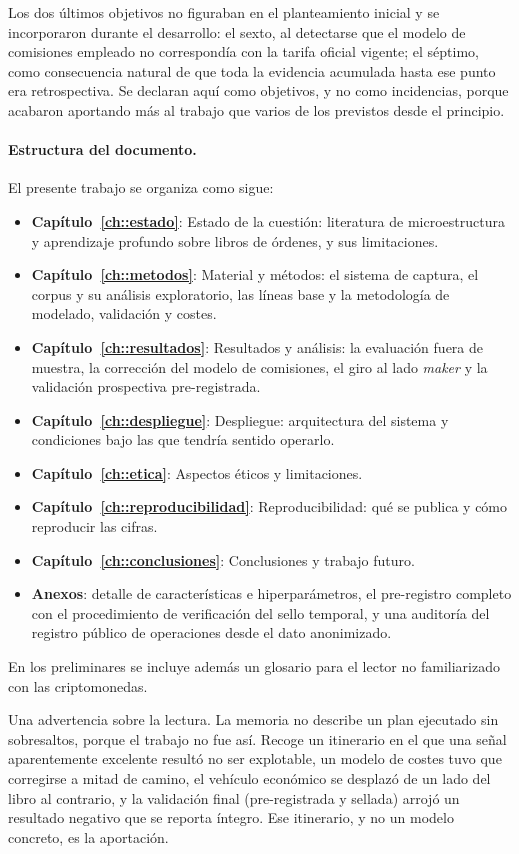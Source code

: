 Los dos últimos objetivos no figuraban en el planteamiento inicial y se incorporaron
durante el desarrollo: el sexto, al detectarse que el modelo de comisiones empleado no
correspondía con la tarifa oficial vigente; el séptimo, como consecuencia natural de que
toda la evidencia acumulada hasta ese punto era retrospectiva. Se declaran aquí como
objetivos, y no como incidencias, porque acabaron aportando más al trabajo que varios de
los previstos desde el principio.

\paragraph{Estructura del documento.} El presente trabajo se organiza como sigue:
\begin{itemize}[noitemsep]
  \item \textbf{Capítulo~\ref{ch::estado}}: Estado de la cuestión: literatura de
  microestructura y aprendizaje profundo sobre libros de órdenes, y sus limitaciones.
  \item \textbf{Capítulo~\ref{ch::metodos}}: Material y métodos: el sistema de captura,
  el corpus y su análisis exploratorio, las líneas base y la metodología de modelado,
  validación y costes.
  \item \textbf{Capítulo~\ref{ch::resultados}}: Resultados y análisis: la evaluación
  fuera de muestra, la corrección del modelo de comisiones, el giro al lado \emph{maker} y la
  validación prospectiva pre-registrada.
  \item \textbf{Capítulo~\ref{ch::despliegue}}: Despliegue: arquitectura del sistema y
  condiciones bajo las que tendría sentido operarlo.
  \item \textbf{Capítulo~\ref{ch::etica}}: Aspectos éticos y limitaciones.
  \item \textbf{Capítulo~\ref{ch::reproducibilidad}}: Reproducibilidad: qué se publica
  y cómo reproducir las cifras.
  \item \textbf{Capítulo~\ref{ch::conclusiones}}: Conclusiones y trabajo futuro.
  \item \textbf{Anexos}: detalle de características e hiperparámetros, el pre-registro
  completo con el procedimiento de verificación del sello temporal, y una auditoría del
  registro público de operaciones desde el dato anonimizado.
\end{itemize}
En los preliminares se incluye además un glosario para el lector no familiarizado con las
criptomonedas.

Una advertencia sobre la lectura. La memoria no describe un plan ejecutado sin sobresaltos,
porque el trabajo no fue así. Recoge un itinerario en el que una señal aparentemente
excelente resultó no ser explotable, un modelo de costes tuvo que corregirse a mitad de
camino, el vehículo económico se desplazó de un lado del libro al contrario, y la validación
final (pre-registrada y sellada) arrojó un resultado negativo que se reporta íntegro. Ese
itinerario, y no un modelo concreto, es la aportación.
